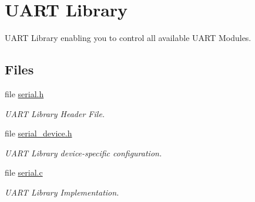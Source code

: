 \hypertarget{group__uart}{\section{U\-A\-R\-T Library}
\label{group__uart}
}


U\-A\-R\-T Library enabling you to control all available U\-A\-R\-T Modules.  


\subsection*{Files}
\begin{DoxyCompactItemize}
\item 
file \hyperlink{serial_8h}{serial.\-h}
\begin{DoxyCompactList}\small\item\em U\-A\-R\-T Library Header File. \end{DoxyCompactList}\item 
file \hyperlink{serial__device_8h}{serial\-\_\-device.\-h}
\begin{DoxyCompactList}\small\item\em U\-A\-R\-T Library device-\/specific configuration. \end{DoxyCompactList}\item 
file \hyperlink{serial_8c}{serial.\-c}
\begin{DoxyCompactList}\small\item\em U\-A\-R\-T Library Implementation. \end{DoxyCompactList}\end{DoxyCompactItemize}

